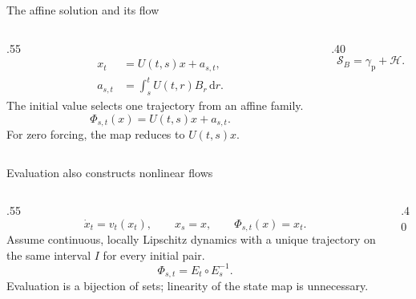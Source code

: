 \begin{frame}[t]{The affine solution and its flow}
\hypertarget{main:affine}{}
\begin{columns}[T,onlytextwidth]
  \begin{column}{.55\textwidth}
    \begin{equation*}
      \begin{aligned}
        x_t&=U(t,s)x+a_{s,t},\\
        a_{s,t}&=\int_s^t U(t,r)B_r\,\mathrm dr.
      \end{aligned}
    \end{equation*}
    The initial value selects one trajectory from an affine family.
    \begin{equation*}
      \Phi_{s,t}(x)=U(t,s)x+a_{s,t}.
    \end{equation*}
    For zero forcing, the map reduces to $U(t,s)x$.
  \end{column}
  \begin{column}{.40\textwidth}
    \begin{equation*}
      \mathcal S_B=\gamma_{\mathrm p}+\mathcal H.
    \end{equation*}
  \end{column}
\end{columns}
\end{frame}

\begin{frame}[t]{Evaluation also constructs nonlinear flows}
\hypertarget{main:general}{}
\begin{columns}[T,onlytextwidth]
  \begin{column}{.55\textwidth}
    \begin{equation*}
      \dot x_t=v_t(x_t),\qquad x_s=x,
      \qquad \Phi_{s,t}(x)=x_t.
    \end{equation*}
    Assume continuous, locally Lipschitz dynamics with a unique trajectory on the same interval $I$ for every initial pair.
    \begin{equation*}
      \Phi_{s,t}=E_t\circ E_s^{-1}.
    \end{equation*}
    Evaluation is a bijection of sets; linearity of the state map is unnecessary.
  \end{column}
  \begin{column}{.40\textwidth}
    \vspace{8pt}
  \end{column}
\end{columns}
\end{frame}


